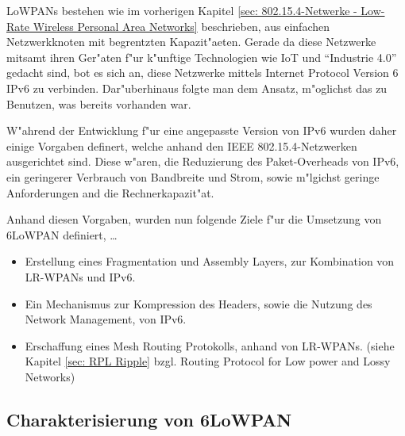 \documentclass[final]{lktseminar}
\begin{document}
LoWPANs bestehen wie im vorherigen Kapitel \ref{sec: 802.15.4-Netwerke - Low-Rate Wireless Personal Area Networks}
beschrieben, aus einfachen Netzwerkknoten mit begrentzten Kapazit"aeten. Gerade da diese Netzwerke mitsamt
 ihren Ger"aten f"ur k"unftige Technologien wie IoT  und ``Industrie 4.0''
 gedacht sind, bot es sich an, diese Netzwerke mittels Internet Protocol Version 6 IPv6 zu verbinden.
 Dar"uberhinaus folgte man dem Ansatz, m"oglichst das zu Benutzen, was bereits vorhanden war.

 W"ahrend der Entwicklung f"ur eine angepasste Version von IPv6 wurden daher
 einige Vorgaben\cite{rfc4919} definert, welche anhand den IEEE 802.15.4-Netzwerken
 ausgerichtet sind. Diese w"aren, die Reduzierung des Paket-Overheads von IPv6,
 ein geringerer Verbrauch von Bandbreite und Strom, sowie m"lgichst geringe Anforderungen
 and die Rechnerkapazit"at.

Anhand diesen Vorgaben, wurden nun folgende Ziele f"ur die Umsetzung von 6LoWPAN definiert, \dots
\begin{itemize}
    \item Erstellung eines Fragmentation und Assembly Layers, zur Kombination von
    LR-WPANs und IPv6.
    \item Ein Mechanismus zur Kompression des Headers, sowie die Nutzung des Network
    Management, von IPv6.
    \item Erschaffung eines Mesh Routing Protokolls, anhand von LR-WPANs.
    (siehe Kapitel \ref{sec: RPL Ripple} bzgl. Routing Protocol for Low power and Lossy Networks)
\end{itemize}




\subsection{Charakterisierung von 6LoWPAN}
\label{sec: Charakterisierung von 6LoWPAN}
\end{document}
